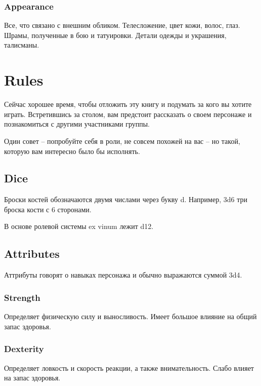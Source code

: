 \documentclass[a5paper,11pt]{book}
\begin{document}
\begin{multicols}{2}
\subsection{Appearance}
Все, что связано с внешним обликом. Телесложение, цвет кожи, волос, глаз. Шрамы, полученные в бою и татуировки. Детали одежды и украшения, талисманы.



\end{multicols}
\chapter{Rules}
\begin{multicols}{2}
Сейчас хорошее время, чтобы отложить эту книгу и подумать за кого вы хотите играть. Встретившись за столом, вам предстоит рассказать о своем персонаже и познакомиться с другими участниками группы.

Один совет -- попробуйте себя в роли, не совсем похожей на вас -- но такой, которую вам интересно было бы исполнять.

\section{Dice}

\lettrine{Б}{}роски костей обозначаются двумя числами через букву d. Например, 3d6 три броска кости с 6 сторонами.

В основе ролевой системы ex vinum лежит d12. %

\section{Attributes}
Аттрибуты говорят о навыках персонажа и обычно выражаются суммой 3d4. %

\subsection{Strength}
Определяет физическую силу и выносливость. Имеет большое влияние на общий запас здоровья.

\subsection{Dexterity}
Определяет ловкость и скорость реакции, а также внимательность. Слабо влияет на запас здоровья.


\end{multicols}
\end{document}
